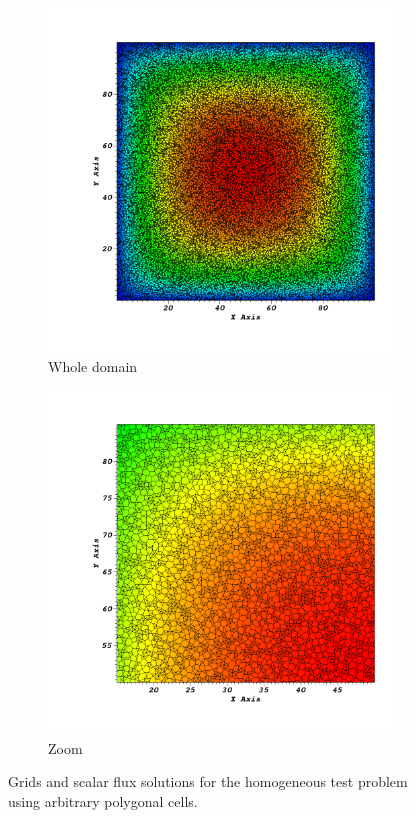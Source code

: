 \documentclass[preprint,10pt]{elsarticle}
\renewcommand{\(}{\left(}
\renewcommand{\)}{\right)}
\renewcommand{\[}{\left[}
\renewcommand{\]}{\right]}
\begin{document}
\begin{figure}[!htbp]
  \centering
  \begin{subfigure}{0.45\textwidth}
    \centering
    \includegraphics[width=\textwidth]{poly_solu0000}
    \caption{Whole domain}
  \end{subfigure}
  \begin{subfigure}{0.45\textwidth}
    \centering
    \includegraphics[width=\textwidth]{poly_solu0001}
    \caption{Zoom}
  \end{subfigure}
  \caption{Grids and scalar flux solutions for the homogeneous test problem  using arbitrary polygonal cells.}
  \label{homog_test_polys}
\end{figure}
\end{document}
